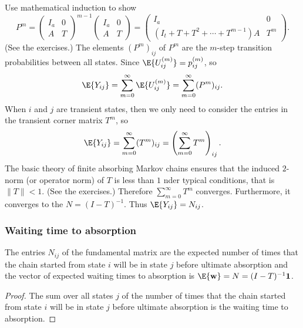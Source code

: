 \documentclass[12pt]{article}
\begin{document}
Use mathematical induction to show
\[
    P^{m} =
    \begin{pmatrix}
        I_a & 0 \\
        A & T
    \end{pmatrix}
    ^{m-1}
    \begin{pmatrix}
        I_a & 0 \\
        A & T
    \end{pmatrix}
    =
    \begin{pmatrix}
        I_a & 0 \\
        (I_t + T + T^2 + \cdots + T^{m-1})A & T^m
    \end{pmatrix}
    .
\] (See the exercises.) The elements \( (P^{m})_{ij} \) of \( P^m \) are
the \( m \)-step transition probabilities between all states.  Since \(
\E{U_{ij}^{(m)}} = p_{ij}^{%
(m)} \), so
\[
    \E{Y_{ij}} = \sum\limits_{m=0}^{\infty} \E{U_{ij}^{(m)}} = \sum\limits_
    {m=0}^{\infty} (P^{m})_{ij}.
\] When \( i \) and \( j \) are transient states, then we only need to
consider the entries in the transient corner matrix \( T^m \), so
\[
    \E{Y_{ij}} = \sum\limits_{m=0}^{\infty} (T^m)_{ij} = \left( \sum\limits_
    {m=0}^{\infty} T^m \right)_{ij}.
\] The basic theory of finite absorbing Markov chains ensures that the
induced \( 2 \)-norm (or operator norm) of \( T \) is less than \( 1
\) nder typical conditions, that is
\( \| T \| < 1 \).  (See the exercises.) Therefore \( \sum_{m=0}^{\infty}
T^m \) converges.  Furthermore, it converges to the  \( N = (I-T)^{-1} \).%
Thus \( \E{Y_{ij}} = N_{ij} \).

\subsubsection*{Waiting time to absorption}

\begin{theorem}
    The entries \( N_{ij} \) of the fundamental matrix are the expected
    number of times that the chain started from state \( i \) will be in
    state \( j \) before ultimate absorption and the vector of expected
    waiting times to absorption is \( \E{\mathbf{w}} = N = (I-T)^{-1}
    \mathbf{1} \).
\end{theorem}

\begin{proof}
    The sum over all states \( j \) of the number of times that the
    chain started from state \( i \) will be in state \( j \) before
    ultimate absorption is the waiting time to absorption.
\end{proof}
\end{document}
